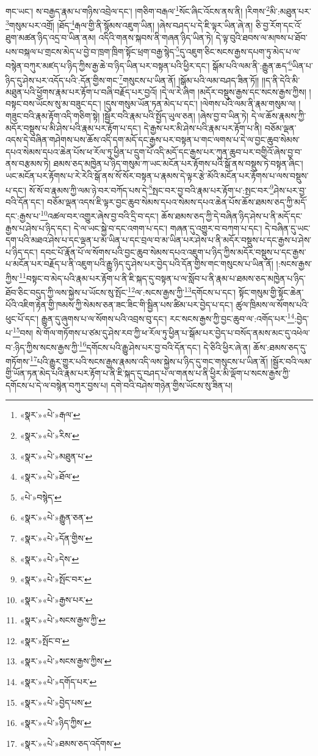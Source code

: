གང་ཡང་། ས་བརྒྱད་རྣམ་པ་གཉིས་འབྲེལ་དང་། །གཅིག་བརྒལ་\footnote{«སྣར་»«པེ་»རྒལ་}སོང་ཞིང་འོངས་ནས་ནི། །རིགས་\footnote{«སྣར་»«པེ་»རིས་}མི་:མཐུན་པར་\footnote{«སྣར་»«པེ་»མཐུན་པ་}གསུམ་པར་འགྲོ། །ཐོད་\footnote{«སྣར་»«པེ་»ཐོལ་}རྒལ་གྱི་ནི་སྙོམས་འཇུག་ཡིན། །ཞེས་བཤད་པ་དེ་ཇི་ལྟར་ཡིན་ཞེ་ན། ཅི་བྱ་རོག་དང་འོ་ཐུག་མཚན་ཉིད་འདྲ་བ་ཡིན་ནམ། འདིའི་གནས་སྐབས་ནི་གཞན་ཉིད་ཡིན་ཏེ། དེ་ལྟ་བུའི་ཐབས་ལ་མཁས་པ་ཐོབ་པས་བསྐལ་པ་གྲངས་མེད་པ་བྱེ་བ་ཁྲག་ཁྲིག་སྟོང་ཕྲག་བརྒྱ་སྙེད་\footnote{«པེ་»བསྙེད་}དུ་འཇུག་ཅིང་སངས་རྒྱས་དཔག་ཏུ་མེད་པ་ལ་བསྙེན་བཀུར་མཛད་པ་ཉིད་ཀྱིས་རྒྱ་ཆེ་བ་ཉིད་ཡིན་པར་བསྟན་པའི་ཕྱིར་དང་། སྒོམ་པའི་ལམ་ནི་:རྒྱུན་ཆད་\footnote{«སྣར་»«པེ་»རྒྱུན་ཅན་}ཡིན་པ་ཉིད་དུ་ཤེས་པར་འདོད་པའི་:དོན་གྱིས་གང་\footnote{«སྣར་»«པེ་»དོན་གྱིས་}གསུངས་པ་ཡིན་ནོ། །སྒོམ་པའི་ལམ་བཤད་ཟིན་ཏོ།། །།ད་ནི་དེའི་མི་མཐུན་པའི་ཕྱོགས་རྣམ་པར་རྟོག་པ་བཞི་བརྗོད་པར་བྱའོ། །དེ་ལ་རེ་ཞིག །མདོར་བསྡུས་རྒྱས་དང་སངས་རྒྱས་ཀྱིས། །བསྟང་བས་ཡོངས་སུ་མ་བཟུང་དང་། །དུས་གསུམ་ཡོན་ཏན་མེད་པ་དང་། །ལེགས་པའི་ལམ་ནི་རྣམ་གསུམ་ལ། །གཟུང་བའི་རྣམ་རྟོག་འདི་གཅིག་སྟེ། །སྦྱོར་བའི་རྣམ་པའི་སྤྱོད་ཡུལ་ཅན། །ཞེས་བྱ་བ་ཡིན་ཏེ། དེ་ལ་ཆོས་རྣམས་ཀྱི་མདོར་བསྡུས་པ་མི་ཤེས་པའི་རྣམ་པར་རྟོག་པ་དང་། དེ་རྒྱས་པར་མི་ཤེས་པའི་རྣམ་པར་རྟོག་པ་ནི། བཅོམ་ལྡན་འདས་དེ་བཞིན་གཤེགས་པས་ཆོས་འདི་དག་མདོ་དང་རྒྱས་པར་བསྟན་པ་གང་ལགས་པ་དེ་ལ་བྱང་ཆུབ་སེམས་དཔའ་སེམས་དཔའ་ཆེན་པོས་ཕ་རོལ་ཏུ་ཕྱིན་པ་དྲུག་པོ་འདི་མདོ་དང་རྒྱས་པར་ཀུན་ཆུབ་པར་བགྱིའོ་ཞེས་བྱ་བ་ནས་བརྩམས་ཏེ། ཐམས་ཅད་མཁྱེན་པ་ཉིད་གསུམ་ཀ་ཡང་མངོན་པར་རྟོགས་པའི་སྒོ་ནས་བསྡུས་ཏེ་བསྟན་ཞིང་། ཡང་མངོན་པར་རྟོགས་པ་རེ་རེའི་སྒོ་ནས་སོ་སོར་བསྟན་པ་རྣམས་དེ་ལྟར་རྩེ་མོའི་མངོན་པར་རྟོགས་པ་ལས་བསྡུས་པ་དང་། སོ་སོ་བ་རྣམས་ཀྱི་ལམ་ཉེ་བར་བཀོད་པས་དེ་\footnote{«སྣར་»«པེ་»དེས་}སྤང་བར་བྱ་བའི་རྣམ་པར་རྟོག་པ་:སྤང་བར་\footnote{«སྣར་»«པེ་»སྤོང་བར་}ཤེས་པར་བྱ་བའི་དོན་དང་། བཅོམ་ལྡན་འདས་ཇི་ལྟར་བྱང་ཆུབ་སེམས་དཔའ་སེམས་དཔའ་ཆེན་པོས་ཆོས་ཐམས་ཅད་ཀྱི་མདོ་དང་:རྒྱས་པ་\footnote{«སྣར་»«པེ་»རྒྱས་པར་}འཚལ་བར་འགྱུར་ཞེས་བྱ་བའི་དྲི་བ་དང་། ཆོས་ཐམས་ཅད་ཀྱི་དེ་བཞིན་ཉིད་ཤེས་པ་ནི་མདོ་དང་རྒྱས་པ་ཤེས་པ་ཉིད་དང་། དེ་ལ་ཡང་སྐྱེ་བ་དང་འགག་པ་དང་། གཞན་དུ་འགྱུར་བ་བཀག་པ་དང་། དེ་བཞིན་དུ་ཡང་དག་པའི་མཐའ་ཤེས་པ་དང་ལྡན་པ་མ་ཡིན་པ་དང་བྲལ་བ་མ་ཡིན་པར་ཤེས་པ་ནི་མདོར་བསྡུས་པ་དང་རྒྱས་པ་ཤེས་པ་ཉིད་དང་། དབང་པོ་རྣོན་པོ་ལ་སོགས་པའི་བྱང་ཆུབ་སེམས་དཔའ་འཇུག་པ་ཉིད་ཀྱིས་མདོར་བསྡུས་པ་དང་རྒྱས་པ་མངོན་པར་བརྗོད་པ་ནི་འཇུག་པའི་རྒྱུ་ཉིད་དུ་ཤེས་པར་བྱེད་པའི་དོན་གྱིས་གང་གསུངས་པ་ཡིན་ནོ། །:སངས་རྒྱས་ཀྱིས་\footnote{«སྣར་»«པེ་»སངས་རྒྱས་ཀྱི་}བསྟང་བ་མེད་པའི་རྣམ་པར་རྟོག་པ་ནི་ཇི་སྐད་དུ་བསྟན་པ་ལ་སློབ་པ་ནི་རྣམ་པ་ཐམས་ཅད་མཁྱེན་པ་ཉིད་ཐོབ་ཅིང་བདུད་ཀྱི་ལས་སྐྱེས་པ་ཡོངས་སུ་སྤོང་\footnote{«སྣར་»སྤོང་བ་}ལ་:སངས་རྒྱས་ཀྱི་\footnote{«སྣར་»«པེ་»སངས་རྒྱས་ཀྱིས་}དགོངས་པ་དང་། སྟོང་གསུམ་གྱི་སྟོང་ཆེན་པོའི་འཇིག་རྟེན་གྱི་ཁམས་ཀྱི་སེམས་ཅན་ཟང་ཟིང་གི་སྦྱིན་པས་ཚིམ་པར་བྱེད་པ་དང་། ཚུལ་ཁྲིམས་ལ་སོགས་པའི་ཕུང་པོ་དང་། རྒྱུན་དུ་ཞུགས་པ་ལ་སོགས་པའི་འབྲས་བུ་དང་། རང་སངས་རྒྱས་ཀྱི་བྱང་ཆུབ་ལ་:འགོད་པར་\footnote{«སྣར་»«པེ་»དགོད་པར་}:བྱེད་པ་\footnote{«སྣར་»«པེ་»བྱེད་པས་}བས། སེ་གོལ་གཏོགས་པ་ཙམ་དུ་ཤེས་རབ་ཀྱི་ཕ་རོལ་ཏུ་ཕྱིན་པ་སྒོམ་པར་བྱེད་པ་བསོད་ནམས་མང་དུ་འཕེལ་བ་:ཉིད་ཀྱིས་སངས་རྒྱས་ཀྱི་\footnote{«སྣར་»«པེ་»ཉིད་ཀྱིས་}དགོངས་པའི་རྒྱུ་ཤེས་པར་བྱ་བའི་དོན་དང་། དེ་ཅིའི་ཕྱིར་ཞེ་ན། ཆོས་:ཐམས་ཅད་དུ་གཏོགས་\footnote{«སྣར་»«པེ་»ཐམས་ཅད་འདོགས་}པའི་རྒྱུར་གྱུར་པའི་སངས་རྒྱས་རྣམས་འདི་ལས་སྐྱེས་པ་ཉིད་དུ་གང་གསུངས་པ་ཡིན་ནོ། །སྦྱོར་བའི་ལམ་གྱི་ཡོན་ཏན་མེད་པའི་རྣམ་པར་རྟོག་པ་ནི་ཇི་སྐད་དུ་བཤད་པ་ལ་གནས་པ་ནི་ཕྱིར་མི་ལྡོག་པ་སངས་རྒྱས་ཀྱི་དགོངས་པ་དེ་ལ་བསྙེན་བཀུར་བྱས་པ། དགེ་བའི་བཤེས་གཉེན་གྱིས་ཡོངས་སུ་ཟིན་པ། 